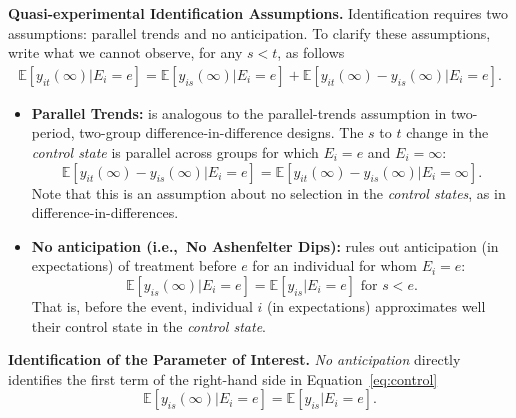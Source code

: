 \noindent \textbf{Quasi-experimental Identification Assumptions.} Identification requires two assumptions: parallel trends and no anticipation. To clarify these assumptions, write what we cannot observe, for any $s < t$, as follows 
\begin{eqnarray}
\mathbb{E} \left[ y_{it} \left( \infty \right) | E_{i} = e \right] = \mathbb{E} \left[ y_{is} \left( \infty \right) | E_{i} = e \right] + \mathbb{E} \left[ y_{it} \left( \infty \right)  - y_{is} \left( \infty \right) | E_{i} = e \right]. \label{eq:control}
\end{eqnarray}

\begin{itemize}
\item \textbf{Parallel Trends:} is analogous to the parallel-trends assumption in two-period, two-group difference-in-difference designs. The $s$ to $t$ change in the \textit{control state} is parallel across groups for which $E_{i} = e$ and $E_{i} = \infty$: 
\begin{equation}
\mathbb{E} \left[ y_{it} \left( \infty \right) - y_{is} \left( \infty \right) | E_{i} = e \right] = \mathbb{E} \left[ y_{it} \left( \infty \right) - y_{is} \left( \infty \right) | E_{i} = \infty \right]. \label{eq:parallel}
\end{equation}
\noindent Note that this is an assumption about no selection in the \textit{control states}, as in difference-in-differences. 
\item \textbf{No anticipation (i.e.,\ No Ashenfelter Dips):} rules out anticipation (in expectations) of treatment before $e$ for an individual for whom $E_{i} = e$: 
\begin{equation}
\mathbb{E} \left[ y_{is} \left( \infty \right) | E_{i} = e \right] = \mathbb{E} \left[ y_{is} | E_{i} = e \right] \text{ for $s < e$.}
\end{equation}
\noindent That is, before the event, individual $i$ (in expectations) approximates well their control state in the \textit{control state}. 
\end{itemize}

\noindent \textbf{Identification of the Parameter of Interest.} \textit{No anticipation} directly identifies the first term of the right-hand side in Equation~\eqref{eq:control}
\begin{equation}
\mathbb{E} \left[ y_{is} \left( \infty \right) | E_{i} = e \right]  = \mathbb{E} \left[ y_{is} | E_{i} = e \right]. 
\end{equation}

